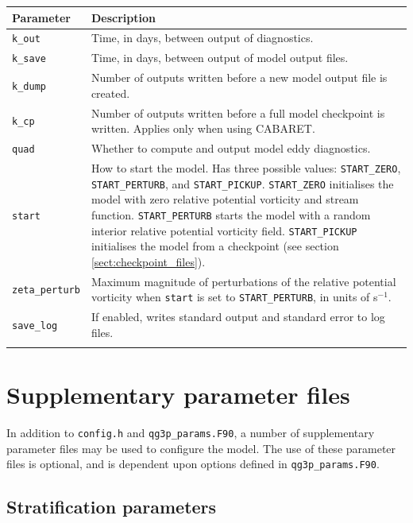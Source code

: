 \documentclass[a4paper]{book}
\begin{document}
\begin{longtable}{ | p{} | p{} | }
  \hline
  Parameter & Description \\
  \hline
  \endhead
  \verb+k_out+  & Time, in days, between output of diagnostics. \\
  \verb+k_save+ & Time, in days, between output of model output files. \\
  \verb+k_dump+ & Number of outputs written before a new model output file is
                  created. \\
  \verb+k_cp+   & Number of outputs written before a full model checkpoint is
                  written. Applies only when using CABARET. \\
  \verb+quad+   & Whether to compute and output model eddy diagnostics. \\
  \verb+start+  & How to start the model. Has three possible values:
                  \verb+START_ZERO+, \verb+START_PERTURB+, and
                  \verb+START_PICKUP+. \verb+START_ZERO+ initialises the model
                  with zero relative potential vorticity and stream function.
                  \verb+START_PERTURB+ starts the model with a random interior
                  relative potential vorticity field. \verb+START_PICKUP+
                  initialises the model from a checkpoint (see section
                  \ref{sect:checkpoint_files}).\\
  \verb+zeta_perturb+ & Maximum magnitude of perturbations of the relative
                        potential vorticity when \verb+start+ is set to
                        \verb+START_PERTURB+, in units of s${}^{-1}$. \\
  \verb+save_log+     & If enabled, writes standard output and standard error
                        to log files. \\
  \hline
  \endfoot
\end{longtable}

\section{Supplementary parameter files}\label{sect:parameter_files}

In addition to \verb+config.h+ and \verb+qg3p_params.F90+, a number of
supplementary parameter files may be used to configure the model. The use of
these parameter files is optional, and is dependent upon options defined in
\verb+qg3p_params.F90+.

\subsection{Stratification parameters}\label{sect:stratification_input}
\end{document}
